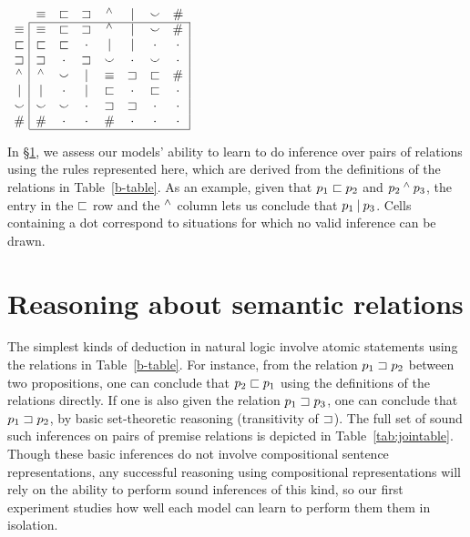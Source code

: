 
\begin{table}[tp]
  \centering  \small
  \setlength{\arraycolsep}{8pt}
  \renewcommand{\arraystretch}{1.1}
  \newcommand{\UNK}{\cdot}  
  $\begin{array}[t]{c@{ \ }|*{7}{c}|}
    \multicolumn{1}{c}{}
             & \nateq     & \natfor     & \natrev     & \natneg    & \natalt     & \natcov     & \multicolumn{1}{c}{\natind} \\
    \cline{2-8}
    \nateq  & \nateq &   \natfor &  \natrev &  \natneg &   \natalt &  \natcov &  \natind \\
    \natfor & \natfor &  \natfor &  \UNK &  \natalt &   \natalt &  \UNK &  \UNK \\
    \natrev & \natrev &  \UNK &  \natrev &  \natcov &   \UNK &  \natcov &  \UNK \\
    \natneg & \natneg &  \natcov &  \natalt &  \nateq &    \natrev &  \natfor &  \natind \\
    \natalt & \natalt &  \UNK &  \natalt &  \natfor &   \UNK &  \natfor &  \UNK \\
    \natcov & \natcov &  \natcov &  \UNK &  \natrev &   \natrev &  \UNK &  \UNK \\
    \natind & \natind & \UNK &  \UNK &  \natind &  \UNK &  \UNK &  \UNK \\
    \cline{2-8}
  \end{array}$
  \caption{In \S\ref{sec:join}, we assess our models' ability to learn to do inference over pairs of relations using the rules represented here, which are derived from the definitions of the relations in Table~\ref{b-table}.  As an example, given that $p_1 \sqsubset p_2$ and $p_2 \mathbin{^{\wedge}} p_3$, the entry in the $\sqsubset$ row and the $\mathbin{^{\wedge}}$ column lets us conclude that $p_1 \mathbin{|} p_3$. Cells containing a dot correspond to situations for which no valid inference can be drawn.} 
  \label{tab:jointable}
\end{table}

\section{Reasoning about semantic relations}\label{sec:join}

The simplest kinds of deduction in natural logic involve atomic statements 
using the relations in Table~\ref{b-table}. 
For instance, from the relation $p_1 \sqsupset p_2$ between two propositions, 
one can conclude that $p_2 \sqsubset p_1$ using the definitions of the relations directly. 
If one is also given the relation $p_1 \sqsupset p_3$, one can conclude that $p_1 \sqsupset p_2$, by basic set-theoretic reasoning (transitivity of $\sqsupset$). The
full set of sound such inferences on pairs of premise relations is depicted in
Table~\ref{tab:jointable}. Though these basic inferences do not involve compositional
sentence representations, any successful reasoning using compositional representations
will rely on the ability to perform sound inferences of this kind, so our first experiment studies how well each model can learn to perform them them in isolation.


